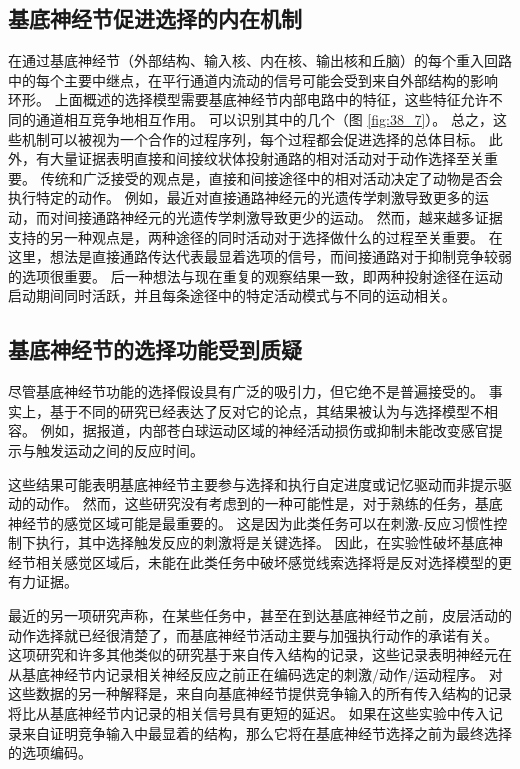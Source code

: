 \subsection{基底神经节促进选择的内在机制}
在通过基底神经节（外部结构、输入核、内在核、输出核和丘脑）的每个重入回路中的每个主要中继点，在平行通道内流动的信号可能会受到来自外部结构的影响 环形。 上面概述的选择模型需要基底神经节内部电路中的特征，这些特征允许不同的通道相互竞争地相互作用。 可以识别其中的几个（图 \ref{fig:38_7}）。 总之，这些机制可以被视为一个合作的过程序列，每个过程都会促进选择的总体目标。 此外，有大量证据表明直接和间接纹状体投射通路的相对活动对于动作选择至关重要。 传统和广泛接受的观点是，直接和间接途径中的相对活动决定了动物是否会执行特定的动作。 例如，最近对直接通路神经元的光遗传学刺激导致更多的运动，而对间接通路神经元的光遗传学刺激导致更少的运动。 然而，越来越多证据支持的另一种观点是，两种途径的同时活动对于选择做什么的过程至关重要。 在这里，想法是直接通路传达代表最显着选项的信号，而间接通路对于抑制竞争较弱的选项很重要。 后一种想法与现在重复的观察结果一致，即两种投射途径在运动启动期间同时活跃，并且每条途径中的特定活动模式与不同的运动相关。

\subsection{基底神经节的选择功能受到质疑}
尽管基底神经节功能的选择假设具有广泛的吸引力，但它绝不是普遍接受的。 事实上，基于不同的研究已经表达了反对它的论点，其结果被认为与选择模型不相容。 例如，据报道，内部苍白球运动区域的神经活动损伤或抑制未能改变感官提示与触发运动之间的反应时间。

这些结果可能表明基底神经节主要参与选择和执行自定进度或记忆驱动而非提示驱动的动作。 然而，这些研究没有考虑到的一种可能性是，对于熟练的任务，基底神经节的感觉区域可能是最重要的。 这是因为此类任务可以在刺激-反应习惯性控制下执行，其中选择触发反应的刺激将是关键选择。 因此，在实验性破坏基底神经节相关感觉区域后，未能在此类任务中破坏感觉线索选择将是反对选择模型的更有力证据。

最近的另一项研究声称，在某些任务中，甚至在到达基底神经节之前，皮层活动的动作选择就已经很清楚了，而基底神经节活动主要与加强执行动作的承诺有关。 这项研究和许多其他类似的研究基于来自传入结构的记录，这些记录表明神经元在从基底神经节内记录相关神经反应之前正在编码选定的刺激/动作/运动程序。 对这些数据的另一种解释是，来自向基底神经节提供竞争输入的所有传入结构的记录将比从基底神经节内记录的相关信号具有更短的延迟。 如果在这些实验中传入记录来自证明竞争输入中最显着的结构，那么它将在基底神经节选择之前为最终选择的选项编码。

